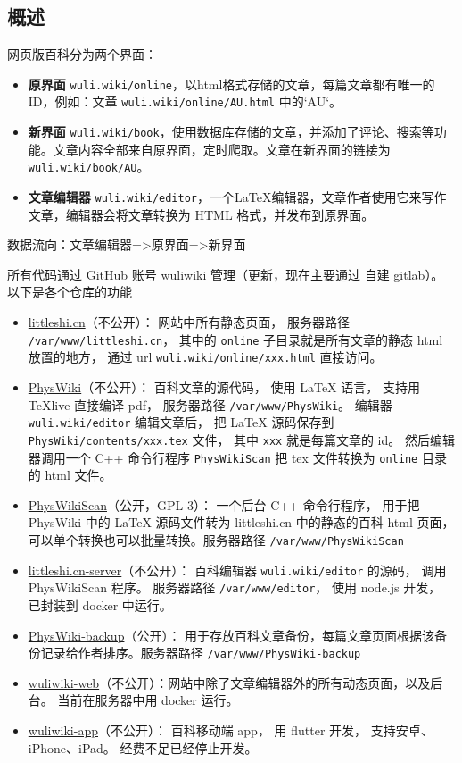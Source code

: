 
\subsection{概述}
网页版百科分为两个界面：
\begin{itemize}
\item \textbf{原界面} \verb`wuli.wiki/online`，以html格式存储的文章，每篇文章都有唯一的ID，例如：文章 \verb`wuli.wiki/online/AU.html` 中的`AU`。 
\item \textbf{新界面} \verb`wuli.wiki/book`，使用数据库存储的文章，并添加了评论、搜索等功能。文章内容全部来自原界面，定时爬取。文章在新界面的链接为 \verb`wuli.wiki/book/AU`。
\item \textbf{文章编辑器} \verb`wuli.wiki/editor`，一个LaTeX编辑器，文章作者使用它来写作文章，编辑器会将文章转换为 HTML 格式，并发布到原界面。
\end{itemize}
数据流向：文章编辑器=>原界面=>新界面

所有代码通过 GitHub 账号 \href{https://github.com/wuliwiki}{wuliwiki} 管理（更新，现在主要通过 \href{http://git.wuli.wiki/wiki}{自建 gitlab}）。 以下是各个仓库的功能
\begin{itemize}
\item \href{https://github.com/wuliwiki/littleshi.cn}{littleshi.cn}（不公开）： 网站中所有静态页面， 服务器路径 \verb`/var/www/littleshi.cn`， 其中的 \verb`online` 子目录就是所有文章的静态 html 放置的地方， 通过 url \verb`wuli.wiki/online/xxx.html` 直接访问。
\item \href{https://github.com/wuliwiki/PhysWiki}{PhysWiki}（不公开）： 百科文章的源代码， 使用 LaTeX 语言， 支持用 TeXlive 直接编译 pdf， 服务器路径 \verb`/var/www/PhysWiki`。 编辑器 \verb`wuli.wiki/editor` 编辑文章后， 把 LaTeX 源码保存到 \verb`PhysWiki/contents/xxx.tex` 文件， 其中 \verb`xxx` 就是每篇文章的 id。 然后编辑器调用一个 C++ 命令行程序 \verb`PhysWikiScan` 把 tex 文件转换为 \verb`online` 目录的 html 文件。
\item \href{https://github.com/wuliwiki/PhysWikiScan}{PhysWikiScan}（公开，GPL-3）： 一个后台 C++ 命令行程序， 用于把 PhysWiki 中的 LaTeX 源码文件转为 littleshi.cn 中的静态的百科 html 页面， 可以单个转换也可以批量转换。服务器路径 \verb`/var/www/PhysWikiScan`
\item \href{https://github.com/wuliwiki/littleshi.cn-server}{littleshi.cn-server}（不公开）： 百科编辑器 \verb`wuli.wiki/editor` 的源码， 调用 PhysWikiScan 程序。 服务器路径 \verb`/var/www/editor`， 使用 node.js 开发， 已封装到 docker 中运行。
\item \href{https://github.com/wuliwiki/PhysWiki-backup}{PhysWiki-backup}（公开）： 用于存放百科文章备份，每篇文章页面根据该备份记录给作者排序。服务器路径 \verb`/var/www/PhysWiki-backup`
\item \href{https://github.com/wuliwiki/wuliwiki-web}{wuliwiki-web}（不公开）：网站中除了文章编辑器外的所有动态页面，以及后台。 当前在服务器中用 docker 运行。
\item \href{https://github.com/wuliwiki/wuliwiki-app}{wuliwiki-app}（不公开）： 百科移动端 app， 用 flutter 开发， 支持安卓、iPhone、iPad。 经费不足已经停止开发。
\end{itemize}

